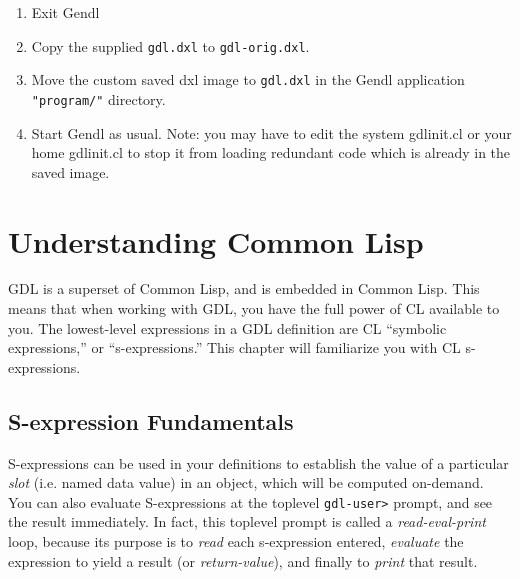 \documentclass [11pt]{book}
\begin{document}
\begin{enumerate}

\item Exit Gendl

\item Copy the supplied \texttt{gdl.dxl} to \texttt{gdl-orig.dxl}.

\item Move the custom saved dxl image to \texttt{gdl.dxl} in the Gendl application \texttt{"program/"} directory.

\item Start Gendl as usual. Note: you may have to edit the system gdlinit.cl or your home gdlinit.cl
to stop it from loading redundant code which is already in the saved image.

\end{enumerate}



\chapter{Understanding Common Lisp}

\label{chap:understandingcommonlisp}



GDL is a superset of Common Lisp, and is embedded in Common
Lisp. This means that when working with GDL, you have the full power
of CL available to you. The lowest-level expressions in a GDL
definition are CL ``symbolic expressions,'' or ``s-expressions.''
This chapter will familiarize you with CL s-expressions.



\section{S-expression Fundamentals}

\label{sec:s-expressionfundamentals}



S-expressions can be used in your definitions to establish
the value of a particular \emph{slot} (i.e. named data value) in an object, which will be
computed on-demand. You can also evaluate S-expressions at the
toplevel \texttt{gdl-user\textgreater} prompt, and see the result immediately. In fact, this toplevel prompt is called a \emph{read-eval-print} loop, because its purpose is to \emph{read} each s-expression  entered, \emph{evaluate} the expression to yield a result (or \emph{return-value}), and finally to \emph{print} that result.
\end{document}
